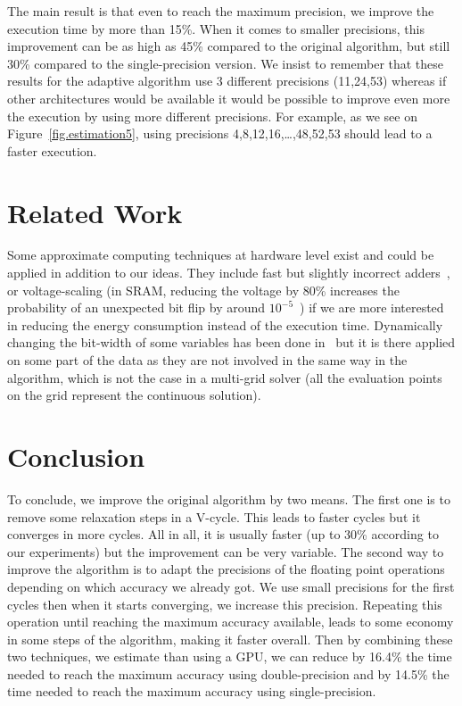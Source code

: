 \documentclass[sigplan]{acmart}
\begin{document}
   The main result is that even to reach the maximum precision, we improve the execution time by more than 15\%. When it comes to smaller precisions, this improvement can be as high as 45\% compared to
   the original algorithm, but still 30\% compared to the single-precision version. We insist to remember that these results for the adaptive algorithm use 3 different precisions (11,24,53)
   whereas if other architectures would be available it would be possible to improve even more the execution by using more different precisions. For example, as we see on Figure~\ref{fig.estimation5}, using precisions
   4,8,12,16,\dots,48,52,53 should lead to a faster execution.
   
   \section{Related Work}
   
   Some approximate computing techniques at hardware level exist and could be applied in addition to our ideas. They include fast but slightly incorrect adders~\cite{Gupta:2011}, or voltage-scaling (in SRAM, reducing
   the voltage by 80\% increases the probability of an unexpected bit flip by around $10^{-5}$~\cite{Sampson:2011})
   if we are more interested in reducing the energy consumption instead of the execution time.
   Dynamically changing the bit-width of some variables has been done in~\cite{Park:2010} but it is there applied on some part of the data as they are not involved in the same way in the algorithm,
   which is not the case in a multi-grid solver (all the evaluation points on the grid represent the continuous solution).
   
   \section{Conclusion}
   
   To conclude, we improve the original algorithm by two means. The first one is to remove some relaxation steps in a V-cycle. This leads to faster cycles but it converges in more cycles. All in all,
   it is usually faster (up to 30\% according to our experiments) but the improvement can be very variable. The second way to improve the algorithm is to adapt the precisions of the floating point
   operations depending on which accuracy we already got. We use small precisions for the first cycles then when it starts converging, we increase this precision. Repeating this operation until reaching the maximum accuracy available, leads
   to some economy in some steps of the algorithm, making it faster overall. Then by combining these two techniques, we estimate than using a GPU, we can reduce by 16.4\% the time needed to reach the maximum accuracy using double-precision and by 14.5\% the time needed
   to reach the maximum accuracy using single-precision.
   
\end{document}
